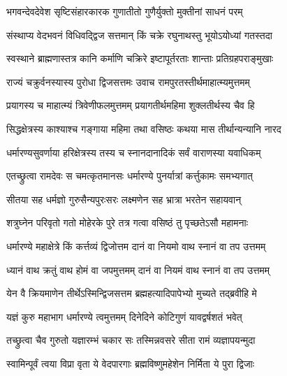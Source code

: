 
\twolineshloka
{भगवन्देवदेवेश सृष्टिसंहारकारक}
{गुणातीतो गुणैर्युक्तो मुक्तीनां साधनं परम्}%

\twolineshloka
{संस्थाप्य वेदभवनं विधिवद्द्विज सत्तमान्}
{किं चक्रे रघुनाथस्तु भूयोऽयोध्यां गतस्तदा}%


\twolineshloka
{स्वस्थाने ब्राह्मणास्तत्र कानि कर्माणि चक्रिरे}
{इष्टापूर्तरताः शान्ताः प्रतिग्रहपराङ्मुखाः}%

\twolineshloka
{राज्यं चक्रुर्वनस्यास्य पुरोधा द्विजसत्तमः}
{उवाच रामपुरतस्तीर्थमाहात्म्यमुत्तमम्}%

\twolineshloka
{प्रयागस्य च माहात्म्यं त्रिवेणीफलमुत्तमम्}
{प्रयागतीर्थमहिमा शुक्लतीर्थस्य चैव हि}%

\twolineshloka
{सिद्धक्षेत्रस्य काश्याश्च गङ्गाया महिमा तथा}
{वसिष्ठः कथया मास तीर्थान्यन्यानि नारद}%

\twolineshloka
{धर्मारण्यसुवर्णाया हरिक्षेत्रस्य तस्य च}
{स्नानदानादिकं सर्वं वाराणस्या यवाधिकम्}%

\twolineshloka
{एतच्छ्रुत्वा रामदेवः स चमत्कृतमानसः}
{धर्मारण्ये पुनर्यात्रां कर्त्तुकामः समभ्यगात्}%

\twolineshloka
{सीतया सह धर्मज्ञो गुरुसैन्यपुरःसरः}
{लक्ष्मणेन सह भ्रात्रा भरतेन सहायवान्}%

\twolineshloka
{शत्रुघ्नेन परिवृतो गतो मोहेरके पुरे}
{तत्र गत्वा वसिष्ठं तु पृच्छतेऽसौ महामनाः}%


\twolineshloka
{धर्मारण्ये महाक्षेत्रे किं कर्त्तव्यं द्विजोत्तम}
{दानं वा नियमो वाथ स्नानं वा तप उत्तमम्}%

\twolineshloka
{ध्यानं वाथ क्रतुं वाथ होमं वा जपमुत्तमम्}
{दानं वा नियमं वाथ स्नानं वा तप उत्तमम्}%

\twolineshloka
{येन वै क्रियमाणेन तीर्थेऽस्मिन्द्विजसत्तम}
{ब्रह्महत्यादिपापेभ्यो मुच्यते तद्ब्रवीहि मे}%


\twolineshloka
{यज्ञं कुरु महाभाग धर्मारण्ये त्वमुत्तमम्}
{दिनेदिने कोटिगुणं यावद्वर्षशतं भवेत्}%

\twolineshloka
{तच्छ्रुत्वा चैव गुरुतो यज्ञारम्भं चकार सः}
{तस्मिन्नवसरे सीता रामं व्यज्ञापयन्मुदा}%

\twolineshloka
{स्वामिन्पूर्वं त्वया विप्रा वृता ये वेदपारगाः}
{ब्रह्मविष्णुमहेशेन निर्मिता ये पुरा द्विजाः}%

